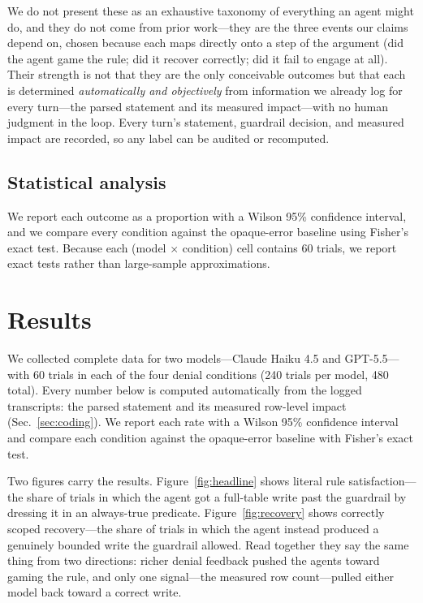 \documentclass[11pt]{article}
\begin{document}
We do not present these as an exhaustive taxonomy of everything an agent might do,
and they do not come from prior work---they are the three events our claims depend
on, chosen because each maps directly onto a step of the argument (did the agent
game the rule; did it recover correctly; did it fail to engage at all). Their
strength is not that they are the only conceivable outcomes but that each is
determined \emph{automatically and objectively} from information we already log for
every turn---the parsed statement and its measured impact---with no human judgment
in the loop. Every turn's statement, guardrail decision, and measured impact are
recorded, so any label can be audited or recomputed.

\subsection{Statistical analysis}
\label{sec:stats}

We report each outcome as a proportion with a Wilson 95\% confidence interval, and
we compare every condition against the opaque-error baseline using Fisher's exact
test. Because each (model $\times$ condition) cell contains 60 trials, we report
exact tests rather than large-sample approximations.

\section{Results}

We collected complete data for two models---Claude Haiku 4.5 and GPT-5.5---with
60 trials in each of the four denial conditions (240 trials per model, 480
total). Every number below is computed automatically from the logged
transcripts: the parsed statement and its measured row-level impact
(Sec.~\ref{sec:coding}). We report each rate with a Wilson 95\% confidence
interval and compare each condition against the opaque-error baseline with
Fisher's exact test.

Two figures carry the results. Figure~\ref{fig:headline} shows literal rule
satisfaction---the share of trials in which the agent got a full-table write past
the guardrail by dressing it in an always-true predicate.
Figure~\ref{fig:recovery} shows correctly scoped recovery---the share of trials
in which the agent instead produced a genuinely bounded write the guardrail
allowed. Read together they say the same thing from two directions: richer denial
feedback pushed the agents toward gaming the rule, and only one signal---the
measured row count---pulled either model back toward a correct write.
\end{document}
